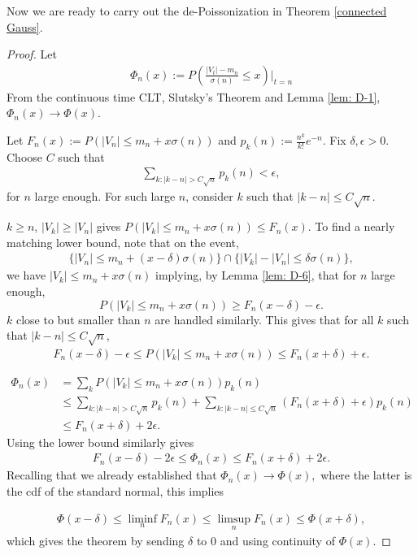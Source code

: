 \documentclass[12pt]{article}
\theoremstyle{definition}
\begin{document}
Now we are ready to carry out the de-Poissonization in Theorem \ref{connected Gauss}.
\begin{proof}
Let
    \begin{align*}
        \Phi_n(x) := P\left(\frac{|V_t|-m_n}{\sigma(n)} \leq x\right)\Big|_{t=n}
    \end{align*}
From the continuous time CLT, Slutsky's Theorem and Lemma \ref{lem: D-1}, $\Phi_n(x) \rightarrow \Phi(x)$.

 Let $F_n(x):= P(|V_n|\leq m_n+x\sigma(n))$ and $p_k(n):= \frac{n^k}{k!}e^{-n}$. Fix $\delta,\epsilon > 0$. Choose $C$ such that 
 \begin{align*}
     \sum_{k:|k-n| > C \sqrt{n}}p_k(n) < \epsilon,
 \end{align*}
for $n$ large enough. For such large $n$, consider $k$ such that $|k-n| \leq C\sqrt{n}$.

$k \geq n$, $|V_k| \geq |V_n|$ gives $P(|V_k| \leq m_n+x\sigma(n)) \leq F_n(x)$. To find a nearly matching lower bound, note that on the event,
\begin{align*}
    \{|V_n| \leq m_n + (x-\delta)\sigma(n)\} \cap \{|V_k|-|V_n| \leq \delta \sigma(n)\},
\end{align*}
we have $|V_k| \leq m_n + x\sigma(n)$ implying, by Lemma \ref{lem: D-6}, that for $n$ large enough, $$P(|V_k| \leq m_n+x\sigma(n)) \geq F_n(x-\delta)-\epsilon.$$
$k$ close to but smaller than $n$ are handled similarly. This gives that for all $k$ such that $|k-n| \leq C \sqrt{n}$,
\begin{align*}
    F_n(x-\delta)-\epsilon \leq P(|V_k| \leq m_n+x\sigma(n)) \leq F_n(x+\delta)+\epsilon.  
\end{align*}

\begin{align*}
    \Phi_n(x) &= \sum_{k}P(|V_k| \leq m_n+x\sigma(n))p_k(n) \\
    &\leq \sum_{k: |k-n| > C\sqrt{n}}p_k(n)+\sum_{k: |k-n| \leq C\sqrt{n}}(F_n(x+\delta)+\epsilon)p_k(n) \\
    &\leq F_n(x+\delta)+2\epsilon.
\end{align*}
Using the lower bound similarly gives
\begin{align*}
    F_n(x-\delta)-2\epsilon \leq \Phi_n(x) \leq F_n(x+\delta)+2\epsilon.
\end{align*}
Recalling that we already established that $\Phi_n(x) \rightarrow \Phi(x),$ where the latter is the cdf of the standard normal, this implies

\begin{align*}
    \Phi(x-\delta)\leq \liminf_n F_n(x) \leq \limsup_n F_n(x) \leq \Phi(x+\delta),
\end{align*}
which gives the theorem by sending $\delta$ to $0$ and using continuity of $\Phi(x)$.
\end{proof}
\end{document}

